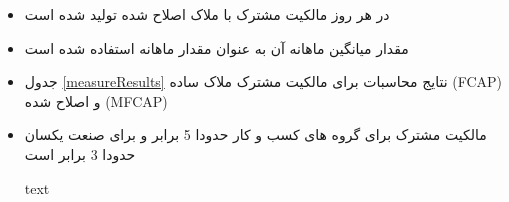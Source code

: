 \begin{LTR}
	
\end{LTR}




\begin{itemize}
	\item 
	در هر روز مالکیت مشترک با ملاک اصلاح شده تولید شده است
	\item 
	مقدار میانگین ماهانه آن به عنوان مقدار ماهانه استفاده شده است
	\item 
	جدول 
	\ref{measureResults}
	نتایج محاسبات برای مالکیت مشترک ملاک ساده 
	(FCAP)
	و اصلاح شده
	(MFCAP)
	
	\item
	مالکیت مشترک برای گروه های کسب و کار حدودا 5 برابر و برای صنعت یکسان حدودا 3 برابر است
	\begin{landscape}
		\begin{table}[p]
			\caption{ text}
			\label{measureResults}
			\resizebox{1.5\textheight}{!}
			{
				\begin{LTR}
					\lr{}
				\end{LTR}
			}
		\end{table}
	\end{landscape}
	
\end{itemize}

\FloatBarrier
